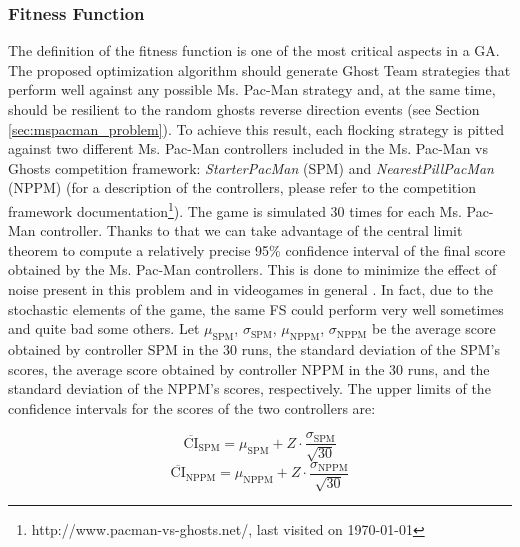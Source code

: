 \documentclass{llncs}
\begin{document}
\subsubsection{Fitness Function}
\label{subsubsec:GA_Fitness}
The definition of the fitness function is one of the most critical
aspects in a GA. The proposed optimization algorithm should generate
Ghost Team strategies that perform well against any possible
Ms. Pac-Man strategy and, at the same time, should be resilient to the
random ghosts reverse direction events (see Section
\ref{sec:mspacman_problem}). To achieve this result, each flocking
strategy is pitted against two different Ms. Pac-Man controllers
included in the Ms. Pac-Man vs Ghosts competition framework:
\textit{StarterPacMan} (SPM) and \textit{NearestPillPacMan}
(NPPM) (for a description of the controllers, please refer to the competition framework documentation\footnote{http://www.pacman-vs-ghosts.net/, last visited on {\today}}). The game is simulated 30 times for each Ms. Pac-Man
controller. Thanks to that we can take advantage of the central limit
theorem to compute a relatively precise 95\% confidence interval of
the final score obtained by the Ms. Pac-Man controllers. This is done to minimize the effect of noise present in this problem and in videogames in general \cite{Mora12}. In fact, due to the stochastic elements of the game, the same FS could perform very well sometimes and quite bad some others. Let $\mu_\mathrm{SPM}$, $\sigma_\mathrm{SPM}$, $\mu_\mathrm{NPPM}$, $\sigma_\mathrm{NPPM}$ be the average score obtained by controller SPM in the 30 runs, the standard deviation of the SPM's scores, the average score obtained by controller NPPM in the 30 runs, and the
standard deviation of the NPPM's scores, respectively. The upper limits of
the confidence intervals for the scores of the two controllers are:
\begin{small}
\begin{equation}
\overline{\mathrm{CI}}_\mathrm{SPM} = \mu_\mathrm{SPM} + Z \cdot \frac{\sigma_\mathrm{SPM}}{\sqrt{30}}
\end{equation}
\begin{equation}
\overline{\mathrm{CI}}_\mathrm{NPPM} = \mu_\mathrm{NPPM} + Z \cdot \frac{\sigma_\mathrm{NPPM}}{\sqrt{30}}
\end{equation}
\end{small}
\end{document}
